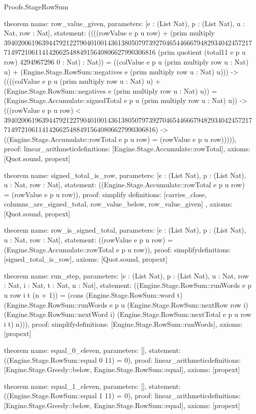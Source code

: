\begin{lexlean}{Proofs.StageRowSum}
\begin{semanticmodule}
theorem{
  name: row_value_given,
  parameters: [e : (List Nat), p : (List Nat), u : Nat, row : Nat],
  statement: ((((rowValue e p u row) + (prim multiply 39402006196394479212279040100143613805079739270465446667948293404245721771497210611414266254884915640806627990306816 (prim quotient (total11 e p u row) 4294967296 0 : Nat) : Nat)) = ((colValue e p u (prim multiply row u : Nat) u) + (Engine.Stage.RowSum::negatives e (prim multiply row u : Nat) u))) -> ((((colValue e p u (prim multiply row u : Nat) u) + (Engine.Stage.RowSum::negatives e (prim multiply row u : Nat) u)) = (Engine.Stage.Accumulate::signedTotal e p u (prim multiply row u : Nat) u)) -> (((rowValue e p u row) < 39402006196394479212279040100143613805079739270465446667948293404245721771497210611414266254884915640806627990306816) -> ((Engine.Stage.Accumulate::rowTotal e p u row) = (rowValue e p u row))))),
  proof: linear_arithmetic{definitions: [Engine.Stage.Accumulate::rowTotal]},
  axioms: [Quot.sound, propext]
}

theorem{
  name: signed_total_is_row,
  parameters: [e : (List Nat), p : (List Nat), u : Nat, row : Nat],
  statement: ((Engine.Stage.Accumulate::rowTotal e p u row) = (rowValue e p u row)),
  proof: simplify{
    definitions: [carries_close, columns_are_signed_total, row_value_below, row_value_given]
  },
  axioms: [Quot.sound, propext]
}

theorem{
  name: row_is_signed_total,
  parameters: [e : (List Nat), p : (List Nat), u : Nat, row : Nat],
  statement: ((rowValue e p u row) = (Engine.Stage.Accumulate::rowTotal e p u row)),
  proof: simplify{definitions: [signed_total_is_row]},
  axioms: [Quot.sound, propext]
}

theorem{
  name: run_step,
  parameters: [e : (List Nat), p : (List Nat), u : Nat, row : Nat, i : Nat, t : Nat, n : Nat],
  statement: ((Engine.Stage.RowSum::runWords e p u row i t (n + 1)) = (cons (Engine.Stage.RowSum::word t) (Engine.Stage.RowSum::runWords e p u (Engine.Stage.RowSum::nextRow row i) (Engine.Stage.RowSum::nextWord i) (Engine.Stage.RowSum::nextTotal e p u row i t) n))),
  proof: simplify{definitions: [Engine.Stage.RowSum::runWords]},
  axioms: [propext]
}

theorem{
  name: equal_0_eleven,
  parameters: [],
  statement: ((Engine.Stage.RowSum::equal 0 11) = 0),
  proof: linear_arithmetic{definitions: [Engine.Stage.Greedy::below, Engine.Stage.RowSum::equal]},
  axioms: [propext]
}

theorem{
  name: equal_1_eleven,
  parameters: [],
  statement: ((Engine.Stage.RowSum::equal 1 11) = 0),
  proof: linear_arithmetic{definitions: [Engine.Stage.Greedy::below, Engine.Stage.RowSum::equal]},
  axioms: [propext]
}


\end{semanticmodule}
\end{lexlean}

